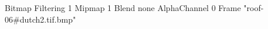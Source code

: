 {Bitmap
	{Filtering 1}
	{Mipmap 1}
	{Blend none}
	{AlphaChannel 0}
	{Frame "roof-06#dutch2.tif.bmp"}
}
